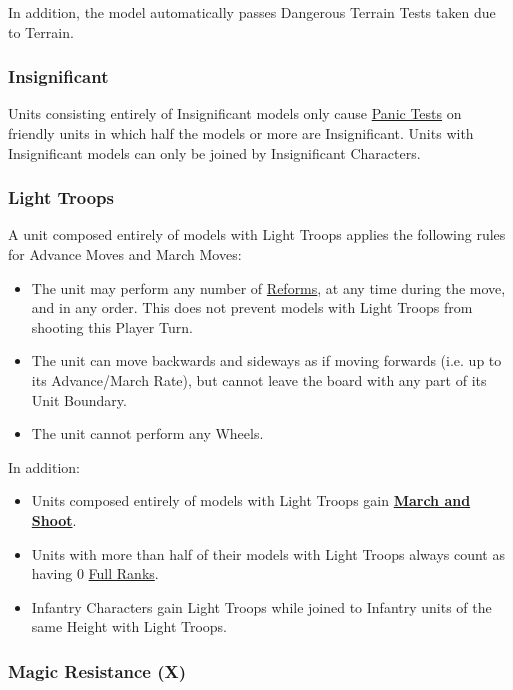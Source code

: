 In addition, the model automatically passes Dangerous Terrain Tests taken due to Terrain.

\subsubsection{Insignificant}
\idx[main=y]{\insignificant}\label{insignificant}

Units consisting entirely of Insignificant models only cause \hyperref[panic_test]{Panic Tests} on friendly units in which half the models or more are Insignificant. Units with Insignificant \rnf{} models can only be joined by Insignificant Characters.

\newpage
\subsubsection{Light Troops}
\idx[main=y]{\lighttroops}\label{light_troops}

A unit composed entirely of models with Light Troops applies the following rules for Advance Moves and March Moves:


\begin{itemize}
\item The unit may perform any number of \hyperref[reform]{Reforms}, at any time during the move, and in any order. This does not prevent models with Light Troops from shooting this Player Turn.
\item The unit can move backwards and sideways as if moving forwards (i.e. up to its Advance/March Rate), but cannot leave the board with any part of its Unit Boundary.
\item The unit cannot perform any Wheels.
\end{itemize}

In addition:
\begin{itemize}
\item Units composed entirely of models with Light Troops gain \hyperref[march_and_shoot]{\textbf{March and Shoot}}.
\item Units with more than half of their models with Light Troops always count as having 0 \hyperref[full_ranks]{Full Ranks}.
\item Infantry Characters gain Light Troops while joined to Infantry units of the same Height with Light Troops.
\end{itemize}

\subsubsection{Magic Resistance (X)}
\idx[main=y]{\magicresistance{}}\label{magic_resistance}

